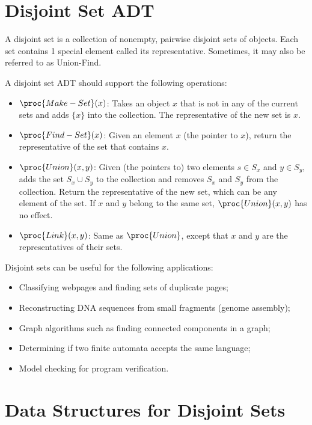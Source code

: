 \section{Disjoint Set ADT}

A disjoint set is a collection of nonempty, pairwise disjoint sets of objects. Each set contains 1 special element called its representative. Sometimes, it may also be referred to as Union-Find.

A disjoint set ADT should support the following operations:

\begin{itemize}
    \item $\proc{Make-Set}(x)$: Takes an object $x$ that is not in any of the current sets and adds $\{ x \}$ into the collection. The representative of the new set is $x$.
    \item $\proc{Find-Set}(x)$: Given an element $x$ (the pointer to $x$), return the representative of the set that contains $x$.
    \item $\proc{Union}(x,y)$: Given (the pointers to) two elements $s \in S_x$ and $y \in S_y$, adds the set $S_x \cup S_y$ to the collection and removes $S_x$ and $S_y$ from the collection. Return the representative of the new set, which can be any element of the set. If $x$ and $y$ belong to the same set, $\proc{Union}(x,y)$ has no effect.
    \item $\proc{Link}(x,y)$: Same as $\proc{Union}$, except that $x$ and $y$ are the representatives of their sets.
\end{itemize}

Disjoint sets can be useful for the following applications:

\begin{itemize}
    \item Classifying webpages and finding sets of duplicate pages;
    \item Reconstructing DNA sequences from small fragments (genome assembly);
    \item Graph algorithms such as finding connected components in a graph;
    \item Determining if two finite automata accepts the same language;
    \item Model checking for program verification.
\end{itemize}

\section{Data Structures for Disjoint Sets}

